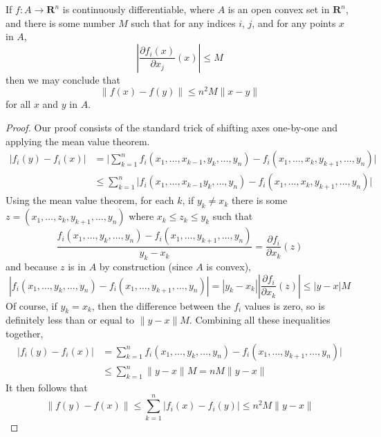 \begin{lemma}
    If $f:A \to \mathbf{R}^n$ is continuously differentiable, where $A$ is an open convex set in $\mathbf{R}^n$, and there is some number $M$ such that for any indices $i$, $j$, and for any points $x$ in $A$,
    \[ | \frac{\partial f_i(x)}{\partial x_j}(x) | \leq M \]
    then we may conclude that
    \[ \| f(x) - f(y) \| \leq n^2M \| x - y \| \]
    for all $x$ and $y$ in $A$.
\end{lemma}
\begin{proof}
    Our proof consists of the standard trick of shifting axes one-by-one and applying the mean value theorem.
    \begin{align*}
        | f_i(y) - f_i(x) | &= \big| \sum_{k = 1}^n f_i(x_1, \dots, x_{k-1}, y_k, \dots, y_n) - f_i(x_1, \dots, x_k, y_{k+1}, \dots, y_n) \big|\\
        &\leq \sum_{k = 1}^n \big|f_i(x_1, \dots, x_{k - 1} y_k, \dots, y_n) - f_i(x_1, \dots, x_k, y_{k+1}, \dots, y_n) \big|
    \end{align*}
    Using the mean value theorem, for each $k$, if $y_k \neq x_k$ there is some $z = (x_1, \dots, z_k, y_{k+1}, \dots, y_n)$ where $x_k \leq z_k \leq y_k$ such that
    \[ \frac{f_i(x_1, \dots, y_k, \dots, y_n) - f_i(x_1, \dots, y_{k+1}, \dots, y_n)}{y_k - x_k} = \frac{\partial f_i}{\partial x_k} (z) \]
    and because $z$ is in $A$ by construction (since $A$ is convex),
    \[ | f_i(x_1, \dots, y_k, \dots, y_n) - f_i(x_1, \dots, y_{k+1}, \dots, y_n) | = | y_k - x_k | | \frac{\partial f_i}{\partial x_k} (z) | \leq |y - x| M \]
    Of course, if $y_k = x_k$, then the difference between the $f_i$ values is zero, so is definitely less than or equal to $\|y - x\| M$. Combining all these inequalities together,
    \begin{align*}
    | f_i(y) - f_i(x) | &= \sum_{k = 1}^n f_i(x_1, \dots, y_k, \dots, y_n) - f_i(x_1, \dots, y_{k+1}, \dots, y_n) |\\
    &\leq \sum_{k = 1}^n \| y - x\| M = nM\|y - x\|
    \end{align*}
    It then follows that
    \[ \| f(y) - f(x) \| \leq \sum_{k = 1}^n |f_i(x) - f_i(y)| \leq n^2M\|y - x\| \]
\end{proof}

